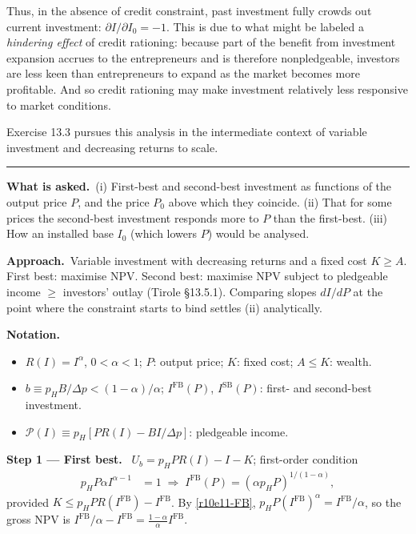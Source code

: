 \documentclass[11pt,a4paper]{article}
\newcommand{\notation}{\par\noindent\textbf{Notation.}}
\newcommand{\step}[2]{\par\medskip\noindent\textbf{Step #1 --- #2.}~}
\newcommand{\asked}{\par\medskip\noindent\textbf{What is asked.}~}
\newcommand{\approach}{\par\smallskip\noindent\textbf{Approach.}~}
\newcommand{\Pc}{\mathcal{P}}
\newcommand{\stmtend}{\par\endgroup\nopagebreak\noindent\rule{\linewidth}{0.4pt}\par\medskip}
\begin{document}
Thus, in the absence of credit constraint, past investment fully crowds out current investment:
\(\partial I/\partial I_0 = -1\). This is due to what might be labeled a \emph{hindering effect} of
credit rationing: because part of the benefit from investment expansion accrues to the entrepreneurs
and is therefore nonpledgeable, investors are less keen than entrepreneurs to expand as the market
becomes more profitable. And so credit rationing may make investment relatively less responsive to
market conditions.

Exercise 13.3 pursues this analysis in the intermediate context of variable investment and
decreasing returns to scale.
\stmtend

\asked (i) First-best and second-best investment as functions of the output price $P$, and the price $P_0$ above which they coincide. (ii) That for some prices the second-best investment responds more to $P$ than the first-best. (iii) How an installed base $I_0$ (which lowers $P$) would be analysed.

\approach Variable investment with decreasing returns and a fixed cost $K\geq A$. First best: maximise NPV. Second best: maximise NPV subject to pledgeable income $\geq$ investors' outlay (Tirole \S13.5.1). Comparing slopes $dI/dP$ at the point where the constraint starts to bind settles (ii) analytically.

\notation
\begin{itemize}
  \item $R(I)=I^\alpha$, $0<\alpha<1$; $P$: output price; $K$: fixed cost; $A\leq K$: wealth.
  \item $b\equiv p_HB/\Delta p<(1-\alpha)/\alpha$; $I^{\text{FB}}(P)$, $I^{\text{SB}}(P)$: first- and second-best investment.
  \item $\Pc(I)\equiv p_H[PR(I)-BI/\Delta p]$: pledgeable income.
\end{itemize}

\step{1}{First best} $U_b=p_HPR(I)-I-K$; first-order condition
\begin{align}
  p_HP\alpha I^{\alpha-1} &= 1 \;\Longrightarrow\; I^{\text{FB}}(P)=(\alpha p_HP)^{1/(1-\alpha)}, \label{r10e11-FB}
\end{align}
provided $K\leq p_HPR(I^{\text{FB}})-I^{\text{FB}}$. By \eqref{r10e11-FB}, $p_HP(I^{\text{FB}})^\alpha=I^{\text{FB}}/\alpha$, so the gross NPV is $I^{\text{FB}}/\alpha-I^{\text{FB}}=\frac{1-\alpha}{\alpha}I^{\text{FB}}$.
\end{document}
